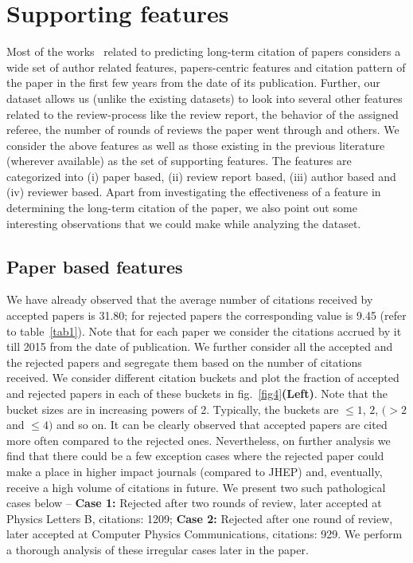 \noindent
\section{Supporting features}
Most of the works~\cite{yan2012better,chakraborty2014towards} related to predicting long-term citation of papers considers a wide set of author related features, papers-centric features and citation pattern of the paper in the first few years from the date of its publication. 
Further, our dataset allows us (unlike the existing datasets) to look into several other features related to the review-process like the review report, the behavior of the assigned referee, the number of rounds of reviews the paper went through and others. 
We consider the above features as well as those existing in the previous literature (wherever available) as the set of supporting features. The features are categorized into (i) paper based, (ii) review report based, (iii) author based and (iv) reviewer based. Apart from investigating the effectiveness of a feature in determining the long-term citation of the paper, we also point out some interesting observations that we could make while analyzing the dataset.    

\subsection{Paper based features}
\label{analysis}
We have already observed that the average number of citations received by accepted papers is 31.80; for rejected papers the corresponding value is 9.45 (refer to table~\ref{tab1}). Note that for each paper we consider the citations accrued by it till 2015 from the date of publication.
We further consider all the accepted and the rejected papers and segregate them based on the number of citations received. We consider different citation buckets and plot the fraction of accepted and rejected papers in each of these buckets in fig.~\ref{fig4}{\bf (Left)}. Note that the bucket sizes are in increasing powers of 2. Typically, the buckets are $\leq 1$, $2$, $(>2$ and $\leq 4)$ and so on. It can be clearly observed that accepted papers are cited more often compared to the rejected ones. Nevertheless, on further analysis we find that there could be a few exception cases where the rejected paper could make a place in higher impact journals (compared to JHEP) and, eventually, receive a high volume of citations in future. We present two such pathological cases below -- {\bf Case 1:} Rejected after two rounds of review, later accepted at Physics Letters B, citations: 1209; {\bf Case 2:} Rejected after one round of review, later accepted at Computer Physics Communications, citations: 929. We perform a thorough analysis of these irregular cases later in the paper.



